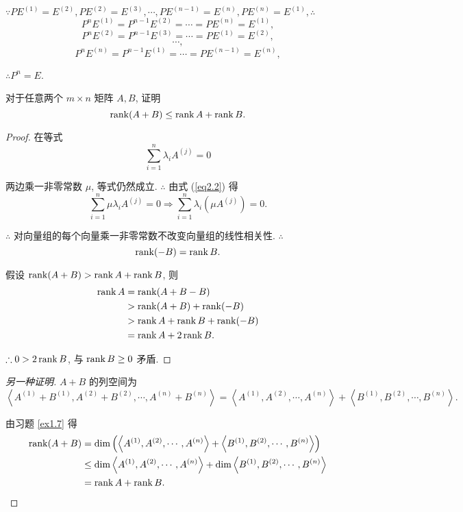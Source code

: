 \documentclass{ctexart}
\begin{document}
\begin{solution}
    $\because PE^{(1)}=E^{(2)},PE^{(2)}=E^{(3)},\cdots,PE^{(n-1)}=E^{(n)},PE^{(n)}=E^{(1)},\therefore$
    \[P^{n}E^{(1)}=P^{n-1}E^{(2)}=\cdots=PE^{(n)}=E^{(1)},\]
    \[P^{n}E^{(2)}=P^{n-1}E^{(3)}=\cdots=PE^{(1)}=E^{(2)},\]
    \[\cdots,\]
    \[P^{n}E^{(n)}=P^{n-1}E^{(1)}=\cdots=PE^{(n-1)}=E^{(n)},\]

    $\therefore P^n=E$.
\end{solution}
\begin{exercise}%
    对于任意两个 $m\times n$ 矩阵 $A,B$, 证明
    \[\operatorname{rank} (A+B)\leq\operatorname{rank} A+\operatorname{rank} B.\]
\end{exercise}
\begin{proof}
    在等式
    \begin{equation}\label{eq2.2}
        \sum\limits_{i=1}^n\lambda_iA^{(j)}=0
    \end{equation}

    两边乘一非零常数 $\mu$, 等式仍然成立. $\therefore$ 由式 (\ref{eq2.2}) 得
    \[\sum\limits_{i=1}^n\mu\lambda_iA^{(j)}=0\Rightarrow\sum\limits_{i=1}^n\lambda_i(\mu A^{(j)})=0.\]

    $\therefore$ 对向量组的每个向量乘一非零常数不改变向量组的线性相关性. $\therefore$
    \[\operatorname{rank} (-B)=\operatorname{rank} B.\]

    假设 $\operatorname{rank}(A+B)>\operatorname{rank} A+\operatorname{rank} B$, 则
    \begin{align*}
        \operatorname{rank} A & =\operatorname{rank} (A+B-B) \\
        & >\operatorname{rank} (A+B)+\operatorname{rank} (-B) \\
        & >\operatorname{rank} A+\operatorname{rank} B+\operatorname{rank} (-B) \\
        & =\operatorname{rank} A+2\operatorname{rank} B.
    \end{align*}

    $\therefore 0>2\operatorname{rank} B$, 与 $\operatorname{rank} B\geq0$ 矛盾.
\end{proof}
\begin{proof}[另一种证明]
    $A+B$ 的列空间为
    \[\left<A^{(1)}+B^{(1)},A^{(2)}+B^{(2)},\cdots,A^{(n)}+B^{(n)}\right>=\left<A^{(1)},A^{(2)},\cdots,A^{(n)}\right>+\left<B^{(1)},B^{(2)},\cdots,B^{(n)}\right>.\]

    由习题 \ref{ex1.7} 得
    \begin{align*}
        \operatorname{rank}(A+B) & =\dim\left(\left<A^{(1)},A^{(2)},\cdots,A^{(n)}\right>+\left<B^{(1)},B^{(2)},\cdots,B^{(n)}\right>\right) \\
        & \leq\dim\left<A^{(1)},A^{(2)},\cdots,A^{(n)}\right>+\dim\left<B^{(1)},B^{(2)},\cdots,B^{(n)}\right> \\
        & =\operatorname{rank} A+\operatorname{rank} B. \qedhere
    \end{align*}
\end{proof}
\end{document}
